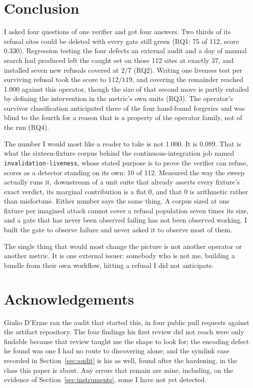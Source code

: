 \documentclass[11pt]{article}
\begin{document}
\section{Conclusion}

I asked four questions of one verifier and got four answers. Two thirds of its refusal sites
could be deleted with every gate still green (RQ1: 75 of 112, score 0.330). Regression testing
the four defects an external audit and a day of manual search had produced left the caught set
on those 112 sites at exactly 37, and installed seven new refusals covered at $2/7$ (RQ2).
Writing one liveness test per surviving refusal took the score to $112/119$, and covering the
remainder reached 1.000 against this operator, though the size of that second move is partly
entailed by defining the intervention in the metric's own units (RQ3). The operator's survivor
classification anticipated three of the four hand-found forgeries and was blind to the fourth
for a reason that is a property of the operator family, not of the run (RQ4).

The number I would most like a reader to take is not 1.000. It is 0.089. That is what the
sixteen-fixture corpus behind the continuous-integration job named
\texttt{invalidation-liveness}, whose stated purpose is to prove the verifier can refuse,
scores as a detector standing on its own: 10 of 112. Measured the way the sweep actually runs
it, downstream of a unit suite that already asserts every fixture's exact verdict, its
marginal contribution is a flat 0, and that 0 is arithmetic rather than misfortune. Either
number says the same thing. A corpus sized at one fixture per imagined attack cannot cover a
refusal population seven times its size, and a gate that has never been observed
failing has not been observed working. I built the gate to observe failure and never asked it
to observe most of them.

The single thing that would most change the picture is not another operator or another metric.
It is one external issuer: somebody who is not me, building a bundle from their own workflow,
hitting a refusal I did not anticipate.

\section*{Acknowledgements}

Giulio D'Erme ran the audit that started this, in four public pull requests against the
artifact repository. The four findings his first review did not reach were only findable
because that review taught me the shape to look for; the encoding defect he found was one I
had no route to discovering alone; and the symlink case recorded in
Section~\ref{sec:audit} is his as well, found after the hardening, in the class this paper
is about. Any errors that remain are mine, including,
on the evidence of Section~\ref{sec:instruments}, some I have not yet detected.
\end{document}
